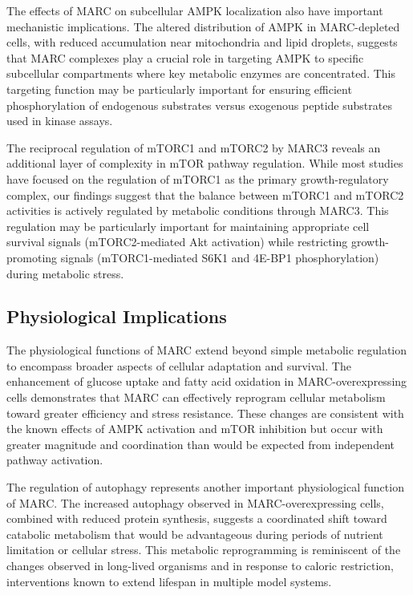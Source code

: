\documentclass[11pt,a4paper]{article}
\begin{document}
The effects of MARC on subcellular AMPK localization also have important mechanistic implications. The altered distribution of AMPK in MARC-depleted cells, with reduced accumulation near mitochondria and lipid droplets, suggests that MARC complexes play a crucial role in targeting AMPK to specific subcellular compartments where key metabolic enzymes are concentrated. This targeting function may be particularly important for ensuring efficient phosphorylation of endogenous substrates versus exogenous peptide substrates used in kinase assays.

The reciprocal regulation of mTORC1 and mTORC2 by MARC3 reveals an additional layer of complexity in mTOR pathway regulation. While most studies have focused on the regulation of mTORC1 as the primary growth-regulatory complex, our findings suggest that the balance between mTORC1 and mTORC2 activities is actively regulated by metabolic conditions through MARC3. This regulation may be particularly important for maintaining appropriate cell survival signals (mTORC2-mediated Akt activation) while restricting growth-promoting signals (mTORC1-mediated S6K1 and 4E-BP1 phosphorylation) during metabolic stress.

\subsection{Physiological Implications}

The physiological functions of MARC extend beyond simple metabolic regulation to encompass broader aspects of cellular adaptation and survival. The enhancement of glucose uptake and fatty acid oxidation in MARC-overexpressing cells demonstrates that MARC can effectively reprogram cellular metabolism toward greater efficiency and stress resistance. These changes are consistent with the known effects of AMPK activation and mTOR inhibition but occur with greater magnitude and coordination than would be expected from independent pathway activation.

The regulation of autophagy represents another important physiological function of MARC. The increased autophagy observed in MARC-overexpressing cells, combined with reduced protein synthesis, suggests a coordinated shift toward catabolic metabolism that would be advantageous during periods of nutrient limitation or cellular stress. This metabolic reprogramming is reminiscent of the changes observed in long-lived organisms and in response to caloric restriction, interventions known to extend lifespan in multiple model systems.
\end{document}
